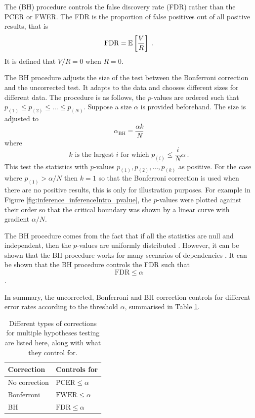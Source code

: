 The \cite{benjamini1995controlling} (BH) procedure controls the false discovery rate (FDR) \citep{benjamini2010discovering} rather than the PCER or FWER. The FDR is the proportion of false positives out of all positive results, that is
\begin{equation}
  \text{FDR} = \operatorname{\mathbb{E}}\left[\dfrac{V}{R}\right]
  \ .
\end{equation}
It is defined that $V/R=0$ when $R=0$.

The BH procedure adjusts the size of the test between the Bonferroni correction and the uncorrected test. It adapts to the data and chooses different sizes for different data. The procedure is as follows, the $p$-values are ordered such that $p_{(1)}\leqslant p_{(2)}\leqslant \dotsc \leqslant p_{(N)}$. Suppose a size $\alpha$ is provided beforehand. The size is adjusted to
\begin{equation}
  \alpha_{\text{BH}} = \frac{\alpha k}{N}
\end{equation}
where
\begin{equation}
  k\text{ is the largest }i\text{ for which }p_{(i)}\leqslant\frac{i}{N}\alpha
  \ .
\end{equation}
This test the statistics with $p$-values $p_{(1)},p_{(2)},\dotsc,p_{(k)}$ as positive. For the case where $p_{(1)}>\alpha/N$ then $k=1$ so that the Bonferroni correction is used when there are no positive results, this is only for illustration purposes. For example in Figure \ref{fig:inference_inferenceIntro_pvalue}, the $p$-values were plotted against their order so that the critical boundary was shown by a linear curve with gradient $\alpha/N$.

The BH procedure comes from the fact that if all the statistics are null and independent, then the $p$-values are uniformly distributed \citep{simes1986improved}. However, it can be shown that the BH procedure works for many scenarios of dependencies \citep{benjamini2001control}. It can be shown that the BH procedure controls the FDR such that
\begin{equation}
  \text{FDR}\leqslant\alpha
\end{equation}
\citep{benjamini1995controlling}.

In summary, the uncorrected, Bonferroni and BH correction controls for different error rates according to the threshold $\alpha$, summarised in Table \ref{table:inference_corrections}.

\begin{table}
    \centering
    \begin{tabular}{l|l}
        Correction&Controls for\\\hline
        No correction&$\text{PCER}\leqslant\alpha$\\
        Bonferroni&$\text{FWER}\leqslant\alpha$\\
        BH&$\text{FDR}\leqslant\alpha$
    \end{tabular}
    \caption{Different types of corrections for multiple hypotheses testing are listed here, along with what they control for.}
    \label{table:inference_corrections}
\end{table}

